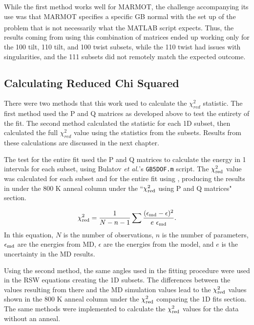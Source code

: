 \documentclass[twoside,senior]{BYUPhys}
\begin{document}
While the first method works well for MARMOT, the challenge accompanying its use was that MARMOT specifies a specific GB normal with the set up of the problem that is not necessarily what the MATLAB\textsuperscript{\textregistered} script expects.  Thus, the results coming from using this combination of matrices ended up working only for the \textlangle{}100\textrangle{} tilt, \textlangle{}110\textrangle{} tilt, and \textlangle{}100\textrangle{} twist subsets, while the \textlangle{}110\textrangle{} twist had issues with singularities, and the \textlangle{}111\textrangle{} subsets did not remotely match the expected outcome.

\subsection{Calculating Reduced Chi Squared\label{chi2:chi2red}}
There were two methods that this work used to calculate the $\chi^2_{red}$ statistic.  The first method used the P and Q matrices as developed above to test the entirety of the fit.  The second method calculated the statistic for each 1D subset, then calculated the full $\chi^2_{red}$ value using the statistics from the subsets.  Results from these calculations are discussed in the next chapter.

The test for the entire fit used the P and Q matrices to calculate the energy in 1\textdegree{} intervals for each subset, using Bulatov \emph{et al.}'s \lstinline!GB5DOF.m! script.  The $\chi_{\textnormal{red}}^2$ value was calculated for each subset and for the entire fit using , producing the results in  under the 800 K anneal column under the ``$\chi_{\textnormal{red}}^2$ using P and Q matrices" section.

\begin{equation}
\label{eq:chi2}
\chi^2_{\textnormal{red}} = \frac{1}{N-n-1} \sum \frac{(\epsilon_{\textnormal{md}} - \epsilon)^2}{e\ \epsilon_{\textnormal{md}}}.
\end{equation}
In this equation, $N$ is the number of observations, $n$ is the number of parameters, $\epsilon_{\textnormal{md}}$ are the energies from MD, $\epsilon$ are the energies from the model, and $e$ is the uncertainty in the MD results.

Using the second method, the same angles used in the fitting procedure were used in the RSW equations creating the 1D subsets.  The differences between the values resulting from there and the MD simulation values lead to the $\chi_{\textnormal{red}}^2$ values shown in the 800 K anneal column under the $\chi_{\textnormal{red}}^2$ comparing the 1D fits section.  The same methods were implemented to calculate the $\chi_{\textnormal{red}}^2$ values for the data without an anneal.
\end{document}
